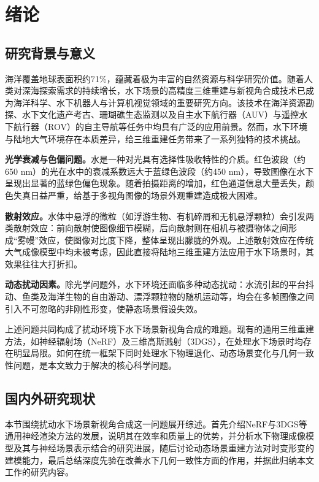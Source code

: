\chapter{绪论}

\section{研究背景与意义}

海洋覆盖地球表面积约71\%，蕴藏着极为丰富的自然资源与科学研究价值。随着人类对深海探索需求的持续增长，水下场景的高精度三维重建与新视角合成技术已成为海洋科学、水下机器人与计算机视觉领域的重要研究方向。该技术在海洋资源勘探、水下文化遗产考古、珊瑚礁生态监测以及自主水下航行器（AUV）与遥控水下航行器（ROV）的自主导航等任务中均具有广泛的应用前景。然而，水下环境与陆地大气环境存在本质差异，给三维重建任务带来了一系列独特的技术挑战。

\textbf{光学衰减与色偏问题。}水是一种对光具有选择性吸收特性的介质。红色波段（约650 nm）的光在水中的衰减系数远大于蓝绿色波段（约450 nm），导致图像在水下呈现出显著的蓝绿色偏色现象。随着拍摄距离的增加，红色通道信息大量丢失，颜色失真日益严重，给基于多视角图像的场景外观重建造成极大困难。

\textbf{散射效应。}水体中悬浮的微粒（如浮游生物、有机碎屑和无机悬浮颗粒）会引发两类散射效应：前向散射使图像细节模糊，后向散射则在相机与被摄物体之间形成“雾幔”效应，使图像对比度下降，整体呈现出朦胧的外观。上述散射效应在传统大气成像模型中均未被考虑，因此直接将陆地三维重建方法应用于水下场景时，其效果往往大打折扣。

\textbf{动态扰动因素。}除光学问题外，水下环境还面临多种动态扰动：水流引起的平台抖动、鱼类及海洋生物的自由游动、漂浮颗粒物的随机运动等，均会在多帧图像之间引入不可忽略的非刚性形变，使静态场景假设失效。

上述问题共同构成了扰动环境下水下场景新视角合成的难题。现有的通用三维重建方法，如神经辐射场（NeRF）及三维高斯溅射（3DGS），在处理水下场景时均存在明显局限。如何在统一框架下同时处理水下物理退化、动态场景变化与几何一致性问题，是本文致力于解决的核心科学问题。

\section{国内外研究现状}

本节围绕扰动水下场景新视角合成这一问题展开综述。首先介绍NeRF与3DGS等通用神经渲染方法的发展，说明其在效率和质量上的优势，并分析水下物理成像模型及其与神经场景表示结合的研究进展，随后讨论动态场景重建方法对时变形变的建模能力，最后总结深度先验在改善水下几何一致性方面的作用，并据此归纳本文工作的研究内容。

